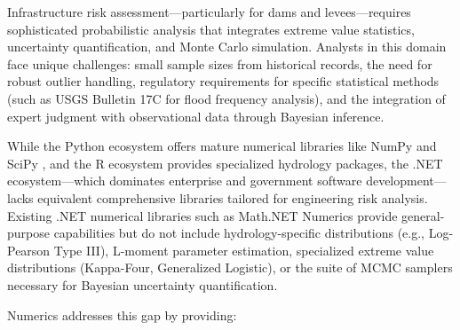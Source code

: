\documentclass[10pt,a4paper,onecolumn]{article}
\begin{document}
Infrastructure risk assessment---particularly for dams and levees---requires sophisticated probabilistic analysis that integrates extreme value statistics, uncertainty quantification, and Monte Carlo simulation. Analysts in this domain face unique challenges: small sample sizes from historical records, the need for robust outlier handling, regulatory requirements for specific statistical methods (such as USGS Bulletin 17C for flood frequency analysis), and the integration of expert judgment with observational data through Bayesian inference.

While the Python ecosystem offers mature numerical libraries like NumPy \citep{harris2020} and SciPy \citep{virtanen2020}, and the R ecosystem provides specialized hydrology packages, the .NET ecosystem---which dominates enterprise and government software development---lacks equivalent comprehensive libraries tailored for engineering risk analysis. Existing .NET numerical libraries such as Math.NET Numerics provide general-purpose capabilities but do not include hydrology-specific distributions (e.g., Log-Pearson Type III), L-moment parameter estimation, specialized extreme value distributions (Kappa-Four, Generalized Logistic), or the suite of MCMC samplers necessary for Bayesian uncertainty quantification.

Numerics addresses this gap by providing:
\end{document}
